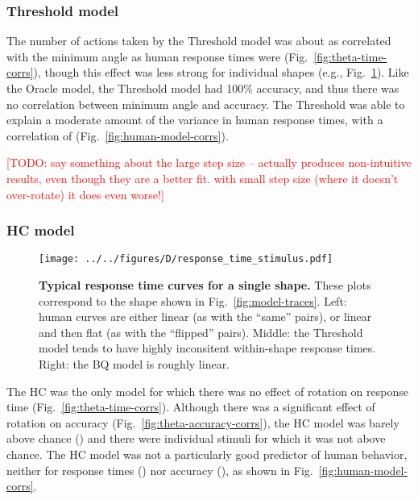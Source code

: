 \documentclass[10pt,letterpaper]{article}
\newcommand{\TODO}[1]{\textcolor{red}{[TODO: #1]}}
\newcommand{\Oc}[0]{Oracle}
\newcommand{\Th}[0]{Threshold}
\newcommand{\Hc}[0]{HC}
\newcommand{\Bq}[0]{BQ}
\begin{document}
\subsubsection{\Th{} model}

The number of actions taken by the \Th{} model was about as correlated
with the minimum angle as human response times were
(Fig.~\ref{fig:theta-time-corrs}), though this effect was less strong
for individual shapes (e.g.,
Fig.~\ref{fig:response-time-stimulus}). Like the \Oc{} model, the
\Th{} model had 100\% accuracy, and thus there was no correlation
between minimum angle and accuracy. The \Th{} was able to explain a
moderate amount of the variance in human response times, with a
correlation of \ThTimeCorr{} (Fig.~\ref{fig:human-model-corrs}).

\TODO{say something about the large step size -- actually produces
  non-intuitive results, even though they are a better fit. with small
  step size (where it doesn't over-rotate) it does even worse!}

\subsubsection{\Hc{} model}

\begin{figure}[t]
  \begin{center}
    \texttt{[image: ../../figures/D/response\_time\_stimulus.pdf]}
    \caption{\textbf{Typical response time curves for a single shape.}
      These plots correspond to the shape shown in
      Fig.~\ref{fig:model-traces}. Left: human curves are either
      linear (as with the ``same'' pairs), or linear and then flat (as
      with the ``flipped'' pairs). Middle: the \Th{} model tends to
      have highly inconsitent within-shape response times. Right: the
      \Bq{} model is roughly linear.}
    \label{fig:response-time-stimulus}
  \end{center}
\end{figure}

The \Hc{} was the only model for which there was no effect of rotation
on response time (Fig.~\ref{fig:theta-time-corrs}). Although there was
a significant effect of rotation on accuracy
(Fig.~\ref{fig:theta-accuracy-corrs}), the \Hc{} model was barely
above chance (\HcAccuracy{}) and there were \HcNumChance{} individual
stimuli for which it was not above chance. The \Hc{} model was not a
particularly good predictor of human behavior, neither for response
times (\HcTimeCorr{}) nor accuracy (\HcAccuracyCorr{}), as shown in
Fig.~\ref{fig:human-model-corrs}.
\end{document}
